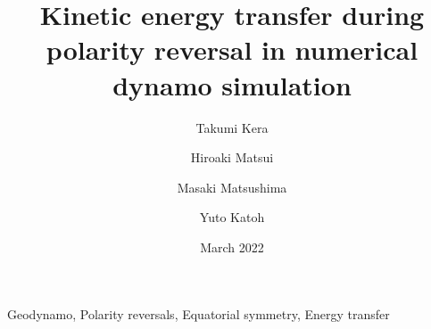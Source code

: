 \documentclass[review]{elsarticle}
\date{March 2022}
\begin{document}
\title{Kinetic energy transfer during polarity reversal in numerical dynamo simulation}

\author[Tohoku]{Takumi Kera}
\author[ucd]{Hiroaki Matsui}
\author[TITECH]{Masaki Matsushima}
\author[Tohoku]{Yuto Katoh}

\address[Tohoku]{Department of Geophysics, Tohoku University, Sendai, Japan.}
\address[ucd]{Department of the Earth and Planetary Sciences, University of California, Davis, CA, USA.}
\address[TITECH]{Department of Earth and Planetary Sciences, Tokyo Institute of Technology, Tokyo, Japan.}

\begin{keyword}
Geodynamo, 
{\color{red} 
Polarity reversals, Equatorial symmetry, Energy transfer
}
\end{keyword}
\end{document}
